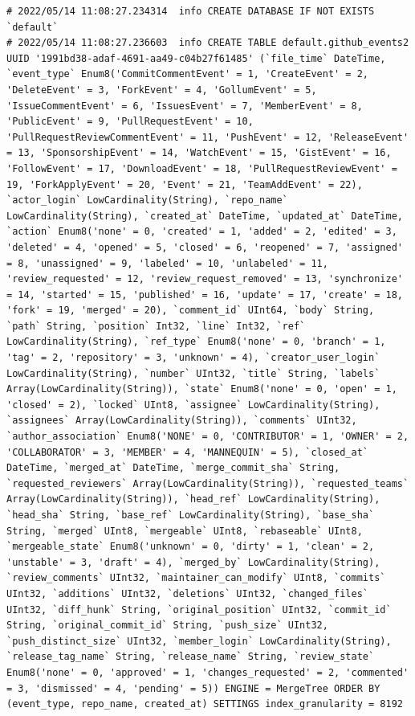 \begin{verbatim}
# 2022/05/14 11:08:27.234314  info CREATE DATABASE IF NOT EXISTS `default`
# 2022/05/14 11:08:27.236603  info CREATE TABLE default.github_events2 UUID '1991bd38-adaf-4691-aa49-c04b27f61485' (`file_time` DateTime, `event_type` Enum8('CommitCommentEvent' = 1, 'CreateEvent' = 2, 'DeleteEvent' = 3, 'ForkEvent' = 4, 'GollumEvent' = 5, 'IssueCommentEvent' = 6, 'IssuesEvent' = 7, 'MemberEvent' = 8, 'PublicEvent' = 9, 'PullRequestEvent' = 10, 'PullRequestReviewCommentEvent' = 11, 'PushEvent' = 12, 'ReleaseEvent' = 13, 'SponsorshipEvent' = 14, 'WatchEvent' = 15, 'GistEvent' = 16, 'FollowEvent' = 17, 'DownloadEvent' = 18, 'PullRequestReviewEvent' = 19, 'ForkApplyEvent' = 20, 'Event' = 21, 'TeamAddEvent' = 22), `actor_login` LowCardinality(String), `repo_name` LowCardinality(String), `created_at` DateTime, `updated_at` DateTime, `action` Enum8('none' = 0, 'created' = 1, 'added' = 2, 'edited' = 3, 'deleted' = 4, 'opened' = 5, 'closed' = 6, 'reopened' = 7, 'assigned' = 8, 'unassigned' = 9, 'labeled' = 10, 'unlabeled' = 11, 'review_requested' = 12, 'review_request_removed' = 13, 'synchronize' = 14, 'started' = 15, 'published' = 16, 'update' = 17, 'create' = 18, 'fork' = 19, 'merged' = 20), `comment_id` UInt64, `body` String, `path` String, `position` Int32, `line` Int32, `ref` LowCardinality(String), `ref_type` Enum8('none' = 0, 'branch' = 1, 'tag' = 2, 'repository' = 3, 'unknown' = 4), `creator_user_login` LowCardinality(String), `number` UInt32, `title` String, `labels` Array(LowCardinality(String)), `state` Enum8('none' = 0, 'open' = 1, 'closed' = 2), `locked` UInt8, `assignee` LowCardinality(String), `assignees` Array(LowCardinality(String)), `comments` UInt32, `author_association` Enum8('NONE' = 0, 'CONTRIBUTOR' = 1, 'OWNER' = 2, 'COLLABORATOR' = 3, 'MEMBER' = 4, 'MANNEQUIN' = 5), `closed_at` DateTime, `merged_at` DateTime, `merge_commit_sha` String, `requested_reviewers` Array(LowCardinality(String)), `requested_teams` Array(LowCardinality(String)), `head_ref` LowCardinality(String), `head_sha` String, `base_ref` LowCardinality(String), `base_sha` String, `merged` UInt8, `mergeable` UInt8, `rebaseable` UInt8, `mergeable_state` Enum8('unknown' = 0, 'dirty' = 1, 'clean' = 2, 'unstable' = 3, 'draft' = 4), `merged_by` LowCardinality(String), `review_comments` UInt32, `maintainer_can_modify` UInt8, `commits` UInt32, `additions` UInt32, `deletions` UInt32, `changed_files` UInt32, `diff_hunk` String, `original_position` UInt32, `commit_id` String, `original_commit_id` String, `push_size` UInt32, `push_distinct_size` UInt32, `member_login` LowCardinality(String), `release_tag_name` String, `release_name` String, `review_state` Enum8('none' = 0, 'approved' = 1, 'changes_requested' = 2, 'commented' = 3, 'dismissed' = 4, 'pending' = 5)) ENGINE = MergeTree ORDER BY (event_type, repo_name, created_at) SETTINGS index_granularity = 8192

\end{verbatim}
